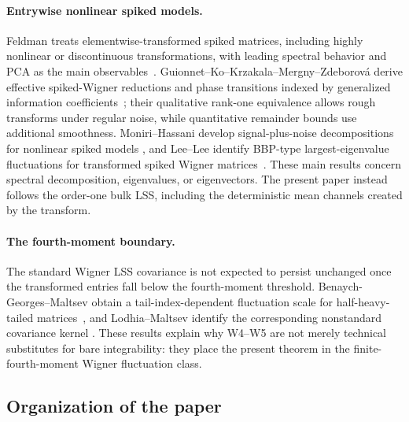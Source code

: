 \documentclass[11pt]{article}
\theoremstyle{definition}
\theoremstyle{remark}
\begin{document}
\paragraph*{Entrywise nonlinear spiked models.}
Feldman treats elementwise-transformed spiked matrices, including highly
nonlinear or discontinuous transformations, with leading spectral behavior
and PCA as the main observables~\cite{Feldman2025}.
Guionnet--Ko--Krzakala--Mergny--Zdeborov\'{a} derive effective spiked-Wigner
reductions and phase transitions indexed by generalized information
coefficients~\cite{GuionnetKoKrzakalaMergnyZdeborova2023}; their qualitative
rank-one equivalence allows rough transforms under regular noise, while
quantitative remainder bounds use additional smoothness.  Moniri--Hassani
develop signal-plus-noise decompositions for nonlinear spiked models
\cite{MoniriHassani2024}, and Lee--Lee identify BBP-type largest-eigenvalue
fluctuations for transformed spiked Wigner matrices~\cite{LeeLee2025}.
These main results concern spectral decomposition, eigenvalues, or
eigenvectors.  The present paper instead follows the order-one bulk LSS,
including the deterministic mean channels created by the transform.

\paragraph*{The fourth-moment boundary.}
The standard Wigner LSS covariance is not expected to persist unchanged once
the transformed entries fall below the fourth-moment threshold.
Benaych-Georges--Maltsev obtain a tail-index-dependent fluctuation scale for
half-heavy-tailed matrices~\cite{BenaychGeorgesMaltsev2016}, and
Lodhia--Maltsev identify the corresponding nonstandard covariance kernel
\cite{LodhiaMaltsev2023}.  These results explain why W4--W5 are not merely
technical substitutes for bare integrability: they place the present theorem
in the finite-fourth-moment Wigner fluctuation class.

\subsection{Organization of the paper}
\end{document}
